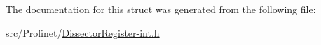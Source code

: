 The documentation for this struct was generated from the following file\-:\begin{DoxyCompactItemize}
\item 
src/\-Profinet/\hyperlink{_dissector_register-int_8h}{Dissector\-Register-\/int.\-h}\end{DoxyCompactItemize}
